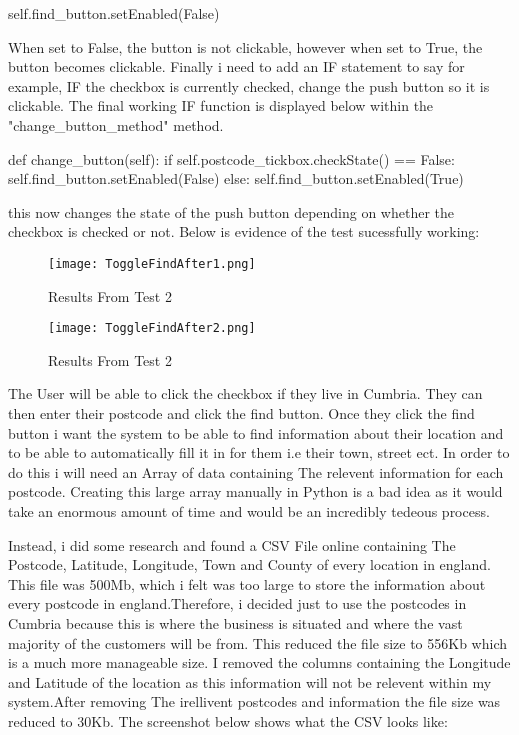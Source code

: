 \begin{python}
self.find_button.setEnabled(False)
\end{python}

When set to False, the button is not clickable, however when set to True, the button becomes clickable. Finally i need to add an IF statement to say for example, IF the checkbox is currently checked, change the push button so it is clickable. The final working IF function is displayed below within the "change_button_method" method.

\begin{python}
def change_button(self):
        if self.postcode_tickbox.checkState() == False:
            self.find_button.setEnabled(False)
        else:
            self.find_button.setEnabled(True)
\end{python}

this now changes the state of the push button depending on whether the checkbox is checked or not. Below is evidence of the test sucessfully working:

\begin{figure}[H]
\caption{Results From Test 2} \label{fig:Results From Test 2}
\hfill\texttt{[image: ToggleFindAfter1.png]}\hspace*{\fill}
\end{figure}

\begin{figure}[H]
\caption{Results From Test 2} \label{fig:Results From Test 2}
\hfill\texttt{[image: ToggleFindAfter2.png]}\hspace*{\fill}
\end{figure}

The User will be able to click the checkbox if they live in Cumbria. They can then enter their postcode and click the find button. Once they click the find button i want the system to be able to find information about their location and to be able to automatically fill it in for them i.e their town, street ect. In order to do this i will need an Array of data containing The relevent information for each postcode. Creating this large array manually in Python is a bad idea as it would take an enormous amount of time and would be an incredibly tedeous process.

 Instead, i did some research and found a CSV File online containing The Postcode, Latitude, Longitude, Town and County of every location in england. This file was 500Mb, which i felt was too large to store the information about every postcode in england.Therefore, i decided just to use the postcodes in Cumbria because this is where the business is situated and where the vast majority of the customers will be from. This reduced the file size to 556Kb which is a much more manageable size. I removed the columns containing the Longitude and Latitude of the location as this information will not be relevent within my system.After removing The irellivent postcodes and information the file size was reduced to 30Kb. The screenshot below shows what the CSV looks like:


